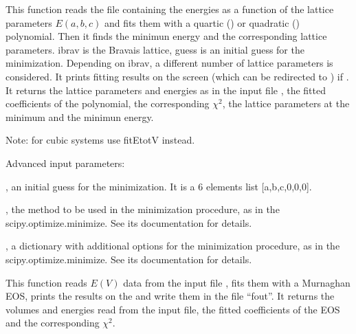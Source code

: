 \documentclass[letterpaper,10pt,english]{sphinxmanual}
\begin{document}
\begin{fulllineitems}
\label{pyqha:pyqha.fitEtot.fitEtot}
This function reads the file  containing the energies as a function
of the lattice parameters \(E(a,b,c)\) and fits them with a quartic () or 
quadratic () polynomial. Then it finds the minimun energy
and the corresponding lattice parameters. 
ibrav is the Bravais lattice, guess is an initial guess for the minimization.
Depending on ibrav, a different number of lattice parameters is considered.
It prints fitting results on the screen (which can be redirected to )
if .
It returns the lattice parameters and energies as in the input file ,
the fitted coefficients of the polynomial, the corresponding \(\chi^2\),
the lattice parameters at the minimum and the minimun energy.

Note: for cubic systems use fitEtotV instead.

Advanced input parameters:

, an initial guess for the minimization. It is a 6 elements list 
{[}a,b,c,0,0,0{]}.

, the method to be used in the minimization procedure, as in the
scipy.optimize.minimize. See its documentation for details.

, a dictionary with additional options for the minimization 
procedure, as in the scipy.optimize.minimize. See its documentation for details.

\end{fulllineitems}


\begin{fulllineitems}
\label{pyqha:pyqha.fitEtot.fitEtotV}
This function reads \(E(V)\) data from the input file , fits them with a Murnaghan EOS,
prints the results on the  and write them in the file ``fout''.
It returns the volumes and energies read from the input file, the fitted coefficients 
of the EOS and the corresponding \(\chi^2\).

\end{fulllineitems}
\end{document}
